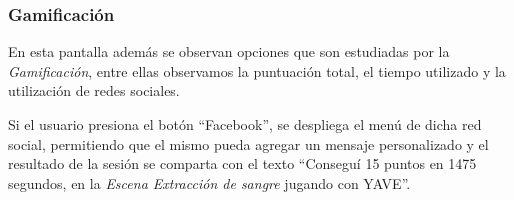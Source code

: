 \subsubsection{Gamificación}

En esta pantalla además se observan opciones que son estudiadas por la
\emph{Gamificación}, entre ellas observamos la puntuación total, el tiempo
utilizado y la utilización de redes sociales.

Si el usuario presiona el botón \enquote{Facebook}, se despliega el menú de
dicha red social, permitiendo que el mismo pueda agregar un mensaje
personalizado y el resultado de la sesión se comparta con el texto \enquote{Conseguí 15 puntos
    en 1475 segundos, en la \emph{Escena Extracción de sangre} jugando con
    YAVE}.

